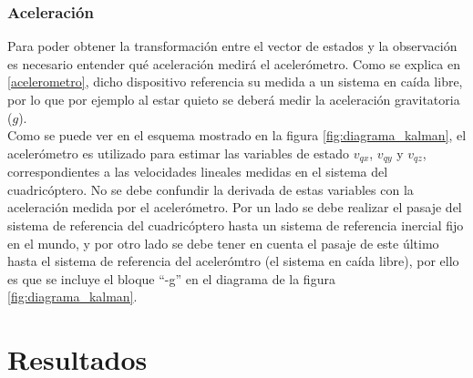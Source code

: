 \documentclass[main]{subfiles}
\begin{document}
\subsubsection{Aceleración}

Para poder obtener la transformación entre el vector de estados y la observación es necesario entender qué aceleración medirá el acelerómetro. Como se explica en \ref{acelerometro}, dicho dispositivo referencia su medida a un sistema en caída libre, por lo que por ejemplo al estar quieto se deberá medir la aceleración gravitatoria ($g$).\\
Como se puede ver en el esquema mostrado en la figura \ref{fig:diagrama_kalman}, el acelerómetro es utilizado para estimar las variables de estado $v_{qx}$, $v_{qy}$ y $v_{qz}$, correspondientes a las velocidades lineales medidas en el sistema del cuadricóptero. No se debe confundir la derivada de estas variables con la aceleración medida por el acelerómetro. Por un lado se debe realizar el pasaje del sistema de referencia del cuadricóptero hasta un sistema de referencia inercial fijo en el mundo, y por otro lado se debe tener en cuenta el pasaje de este último hasta el sistema de referencia del acelerómtro (el sistema en caída libre), por ello es que se incluye el bloque ``-g'' en el diagrama de la figura \ref{fig:diagrama_kalman}.



\section{Resultados}

\end{document}
